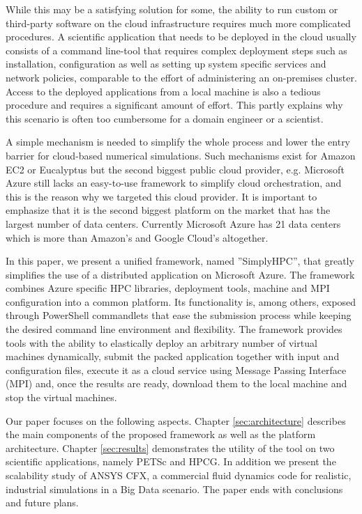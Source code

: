 \documentclass[a4paper,twoside]{article}
\begin{document}
While this may be a satisfying solution for some, the ability to run custom or third-party software on the cloud infrastructure requires much more complicated procedures. A scientific application that needs to be deployed in the cloud usually consists of a command line-tool that requires complex deployment steps such as installation, configuration as well as setting up system specific services and network policies, comparable to the effort of administering an on-premises cluster. Access to the deployed applications from a local machine is also a tedious procedure and requires a significant amount of effort. This partly explains why this scenario is often too cumbersome for a domain engineer or a scientist.  

A simple mechanism is needed to simplify the whole process and lower the entry barrier for cloud-based numerical simulations. Such mechanisms exist for Amazon EC2 or Eucalyptus but the second biggest public cloud provider, e.g. Microsoft Azure still lacks an easy-to-use framework to simplify cloud orchestration, and this is the reason why we targeted this cloud provider. It is important to emphasize that it is the second biggest platform on the market \cite{Garg2013} that has the largest number of data centers. Currently Microsoft Azure has 21 data centers which is more than Amazon's and Google Cloud's altogether.

In this paper, we present a unified framework, named ''SimplyHPC'',  that greatly simplifies the use of a distributed application on Microsoft Azure. The framework combines Azure specific HPC libraries, deployment tools, machine and MPI configuration into a common platform. Its functionality is, among others, exposed through PowerShell commandlets that ease the submission process while keeping the desired command line environment and flexibility. The framework provides tools with the ability to elastically deploy an arbitrary number of virtual machines dynamically, submit the packed application together with input and configuration files, execute it as a cloud service using Message Passing Interface (MPI) and, once the results are ready, download them to the local machine and stop the virtual machines. 

Our paper focuses on the following aspects. Chapter \ref{sec:architecture} describes the main components of the proposed framework as well as the platform architecture. Chapter \ref{sec:results} demonstrates the utility of the tool on two scientific applications, namely PETSc and HPCG. In addition we present the scalability study of ANSYS CFX, a commercial fluid dynamics code for realistic, industrial simulations in a Big Data scenario. The paper ends with conclusions and future plans.
\end{document}
